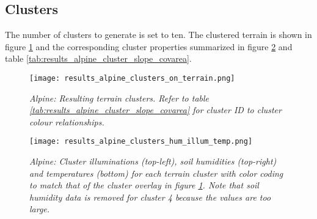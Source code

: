 \subsection{Clusters}

The number of clusters to generate is set to ten. The clustered terrain is shown in figure \ref{fig:results_alpine_terrain_clusters} and the corresponding cluster properties summarized in figure \ref{fig:results_alpine_cluster_hum_temp_illum} and table \ref{tab:results_alpine_cluster_slope_covarea}. 

\begin{figure}
\center
	\texttt{[image: results\_alpine\_clusters\_on\_terrain.png]}
	\caption{\textit{Alpine: Resulting terrain clusters. Refer to table \ref{tab:results_alpine_cluster_slope_covarea} for cluster ID to cluster colour relationships.}}
	\label{fig:results_alpine_terrain_clusters}
\end{figure}

\begin{figure}
\center
	\texttt{[image: results\_alpine\_clusters\_hum\_illum\_temp.png]}
	\caption{\textit{Alpine: Cluster illuminations (top-left), soil humidities (top-right) and temperatures (bottom) for each terrain cluster with color coding to match that of the cluster overlay in figure \ref{fig:results_alpine_terrain_clusters}. Note that soil humidity data is removed for cluster 4 because the values are too large.}}
	\label{fig:results_alpine_cluster_hum_temp_illum}
\end{figure}


